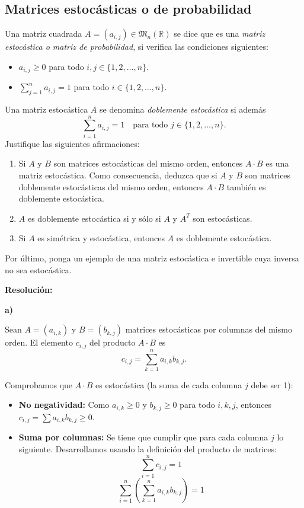 \documentclass[a4paper,12pt]{article}
\begin{document}
\subsection{Matrices estocásticas o de probabilidad}

\begin{ejercicio}[title=Ejercicio 43 (⋆)]
Una matriz cuadrada $A = (a_{i,j}) \in \mathfrak{M}_n(\mathbb{R})$ se dice que es una \textit{matriz estocástica o matriz de probabilidad}, si verifica las condiciones siguientes:
\begin{itemize}
\item $a_{i,j} \ge 0$ para todo $i,j \in \{1,2,\ldots,n\}$.
\item $\displaystyle \sum_{j=1}^n a_{i,j} = 1$ para todo $i \in \{1,2,\ldots,n\}$.
\end{itemize}
Una matriz estocástica $A$ se denomina \emph{doblemente estocástica} si además
\[
\displaystyle \sum_{i=1}^n a_{i,j} = 1 \quad \text{para todo } j \in \{1,2,\ldots,n\}.
\]
Justifique las siguientes afirmaciones:

\begin{enumerate}
\item[a)] Si $A$ y $B$ son matrices estocásticas del mismo orden, entonces $A \cdot B$ es una matriz estocástica. Como consecuencia, deduzca que si $A$ y $B$ son matrices doblemente estocásticas del mismo orden, entonces $A \cdot B$ también es doblemente estocástica.
\item[b)] $A$ es doblemente estocástica si y sólo si $A$ y $A^T$ son estocásticas.
\item[c)] Si $A$ es simétrica y estocástica, entonces $A$ es doblemente estocástica.
\end{enumerate}

Por último, ponga un ejemplo de una matriz estocástica e invertible cuya inversa no sea estocástica.

\tcblower
\textbf{Resolución:}

\vspace{0.5em}

\textbf{a)}

Sean $A=(a_{i,k})$ y $B=(b_{k,j})$ matrices estocásticas por columnas del mismo orden.  
El elemento $c_{i,j}$ del producto $A\cdot B$ es
\[
c_{i,j}=\sum_{k=1}^n a_{i,k} b_{k,j}.
\]

Comprobamos que $A\cdot B$ es estocástica (la suma de cada columna $j$ debe ser 1):

\begin{itemize}
\item \textbf{No negatividad:} Como $a_{i,k}\ge 0$ y $b_{k,j}\ge 0$ para todo $i,k,j$, entonces $c_{i,j} = \sum a_{i,k} b_{k,j} \ge 0$.
\item \textbf{Suma por columnas:} Se tiene que cumplir que para cada columna $j$ lo siguiente. Desarrollamos usando la definición del producto de matrices:
\[
\sum_{i=1}^n c_{i,j} = 1
\]
\[
\sum_{i=1}^n \left( \sum_{k=1}^n a_{i,k} b_{k,j} \right) = 1
\]
\end{itemize}
\end{ejercicio}
\end{document}
